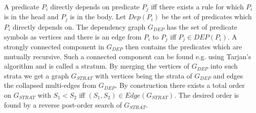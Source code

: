 A predicate $P_i$ directly depends on predicate $P_j$ iff there exists a rule for which $P_i$ is in the head and $P_j$ is in the body. Let $Dep(P_i)$ be the set of predicates which $P_i$ directly depends on. The dependency graph $G_{DEP}$ has the set of predicate symbols as vertices and there is an edge from $P_i$ to $P_j$ iff $P_j \in DEP(P_i)$. A strongly connected component in $G_{DEP}$ then contains the predicates which are mutually recursive. Such a connected component can be found e.g. using Tarjan's algorithm \cite{Tarjan72depthfirst} and is called a stratum. By merging the vertices of $G_{DEP}$ into such strata we get a graph $G_{STRAT}$ with vertices being the strata of $G_{DEP}$ and edges the collapsed multi-edges from $G_{DEP}$. By construction there exists a total order on $G_{STRAT}$ with $S_1 < S_2$ iff $(S_1, S_2) \in Edge(G_{STRAT})$. The desired order is found by a reverse post-order search of $G_{STRAT}$.
